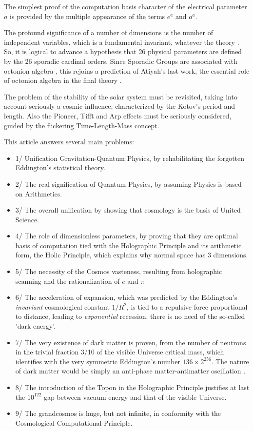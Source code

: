 \documentclass[twoside,draft]{article}
\begin{document}
\begin{sloppypar}
The simplest proof of the computation basis character of the electrical parameter $a$ is provided
by the multiple appearance of the terms $e^{a}$ and $a^{a}$.

The profound significance of a number of dimensions is the number of independent variables,
which is a fundamental invariant, whatever the theory \cite{Weigel}. So, it is logical to advance a
hypothesis that 26 physical parameters are defined by the 26 sporadic cardinal orders. Since
Sporadic Groups are associated with octonion algebra \cite{Atiyah2}, this rejoins a prediction of Atiyah's last
work, the essential role of octonion algebra in the final theory \cite{Atiyah1}.

The problem of the stability of the solar system must be revisited, taking into account
seriously a cosmic influence, characterized by the Kotov's period and length. Also the Pioneer, Tifft
and Arp effects must be seriously considered, guided by the flickering Time-Length-Mass concept.

This article answers several main problems: 
\begin{itemize}
\item 1/ Unification Gravitation-Quantum Physics, by
rehabilitating the forgotten Eddington's statistical theory. 
\item 2/ The real signification of Quantum
Physics, by assuming Physics is based on Arithmetics. 
\item 3/ The overall unification by showing that
cosmology is the basis of United Science. 
\item 4/ The role of dimensionless parameters, by proving that
they are optimal basis of computation tied with the Holographic Principle and its arithmetic form,
the Holic Principle, which explains why normal space has 3 dimensions.
\item 5/ The necessity of the Cosmos vasteness, resulting from holographic scanning and the rationalization of $e$ and $\pi$
\item 6/ The acceleration of expansion, which was predicted by the Eddington's \textit{invariant} cosmological constant $1/R^2$, is tied to a repulsive force proportional to distance, leading to \textit{exponential} recession. there is no need of the so-called 'dark energy'.
\item 7/ The very existence of dark matter is proven, from the number of neutrons in the trivial fraction 3/10 of the visible Universe critical mass, which identifies with the very symmetric Eddington's number $136 \times 2^{256}$. The nature of dark matter would be simply an anti-phase matter-antimatter oscillation \cite{Sanchez1}.  
\item 8/ The introduction of the Topon in the Holographic Principle justifies at last the $10^{122}$ gap between vacuum energy and that of the visible Universe.
\item 9/ The grandcosmos is huge, but not infinite, in conformity with the Cosmological Computational Principle.


\end{itemize}
\end{sloppypar}
\end{document}
